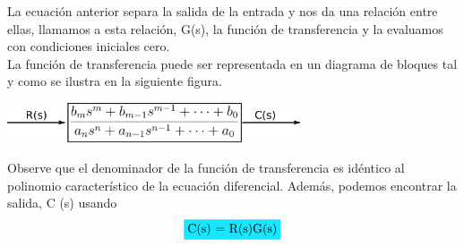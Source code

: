 La ecuación anterior separa la salida de la entrada y nos da una relación entre ellas, llamamos a esta relación, G(s), la función de
transferencia y la evaluamos con condiciones iniciales cero.\\
La función de transferencia puede ser representada en un diagrama de bloques tal y como se ilustra en la siguiente figura.
\begin{center}
	\includegraphics[width=0.65\textwidth]{Contenido/Cuerpo/Capitulo2/Fig24.eps}
	\label{fig:MarcoTeorico:Fig25}
\end{center}
Observe que el denominador de la función de transferencia es idéntico al polinomio característico de la ecuación diferencial. Además, podemos
encontrar la salida, C (s) usando
\begin{equation}
	\colorbox[rgb]{0.1,0.9,1}{C(s) = R(s)G(s)}
\end{equation}


